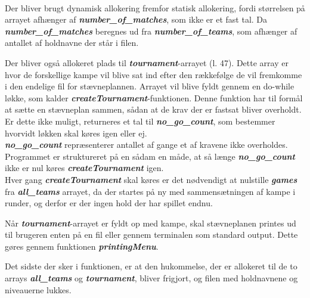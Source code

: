 \\
Der bliver brugt dynamisk allokering fremfor statisk allokering, fordi størrelsen på arrayet afhænger af \textbf{\textit{number\_of\_matches}}, som ikke er et fast tal. Da \textbf{\textit{number\_of\_matches}} beregnes ud fra \textbf{\textit{number\_of\_teams}}, som afhænger af antallet af holdnavne der står i filen. 
\par
Der bliver også allokeret plads til \textbf{\textit{tournament}}-arrayet (l. 47). Dette array er hvor de forskellige kampe vil blive sat ind efter den rækkefølge de vil fremkomme i den endelige fil for stævneplannen. Arrayet vil blive fyldt gennem en do-while løkke, som kalder \textbf{\textit{createTournament}}-funktionen. Denne funktion har til formål at sætte en stævneplan sammen, sådan at de krav der er fastsat bliver overholdt. Er dette ikke muligt, returneres et tal til \textbf{\textit{no\_go\_count}}, som bestemmer hvorvidt løkken skal køres igen eller ej.
\\
\textbf{\textit{no\_go\_count}} repræsenterer antallet af gange et af kravene ikke overholdes. Programmet er struktureret på en sådam en måde, at så længe \textbf{\textit{no\_go\_count}} ikke er nul køres \textbf{\textit{createTournament}} igen.
\\
Hver gang \textbf{\textit{createTournament}} skal køres er det nødvendigt at nulstille \textbf{\textit{games}} fra \textbf{\textit{all\_teams}} arrayet, da der startes på ny med sammensætningen af kampe i runder, og derfor er der ingen hold der har spillet endnu.
\par
Når \textbf{\textit{tournament}}-arrayet er fyldt op med kampe, skal stævneplanen printes ud til brugeren enten på en fil eller gennem terminalen som standard output. Dette gøres gennem funktionen \textbf{\textit{printingMenu}}.
\par
Det sidste der sker i funktionen, er at den hukommelse, der er allokeret til de to arrays \textbf{\textit{all\_teams}} og \textbf{\textit{tournament}}, bliver frigjort, og filen med holdnavnene og niveauerne lukkes.

